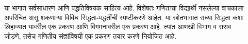 \documentclass[../../include/open-logic-part]{subfiles}
\begin{document}

\begin{editorial}
  या भागात सर्वसाधारण आणि पद्धतिविषयक साहित्य आहे. विशेषतः गणिताचा विद्यार्थी नसलेल्या वाचकाला अपरिचित असू शकणाऱ्या विविध सिद्धता-पद्धतींची स्पष्टीकरणे आहेत. या स्रोतभागात सध्या सिद्धता कशा लिहाव्यात यावरील एक प्रकरण आणि विगमनावरील एक प्रकरण आहे. त्यांत आणखी विभाग व सराव जोडणे, तसेच गणितीय संज्ञांविषयी एक प्रकरण तयार करणे नियोजित आहे.
\end{editorial}



\OLEndPartHook
\end{document}
